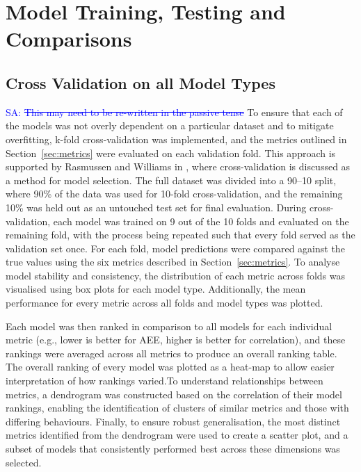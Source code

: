 \documentclass{ucdgradtaughtthesis}
\newcommand{\Sarp}[1]{{\textcolor{blue}{{SA: #1}} }}
\begin{document}
\section{Model Training, Testing and Comparisons}
%
%
\subsection{Cross Validation on all Model Types}
\Sarp{\sout{This may need to be re-written in the passive tense}}
To ensure that each of the models was not overly dependent on a particular dataset and to mitigate overfitting, 
k-fold cross-validation was implemented, and the metrics outlined in Section~\ref{sec:metrics} were evaluated on each validation fold. 
This approach is supported by Rasmussen and Williams in \cite[Ch.5]{bible}, where cross-validation is discussed as a method for model selection.
The full dataset was divided into a 90--10 split, where 90\% of the data was used for 10-fold cross-validation, and the remaining 10\% was held out 
as an untouched test set for final evaluation. During cross-validation, each model was trained on 9 out of the 10 folds and evaluated on the remaining fold, 
with the process being repeated such that every fold served as the validation set once. For each fold, model predictions were compared against the true values using the six metrics
described in Section~\ref{sec:metrics}.
To analyse model stability and consistency, the distribution of each metric across folds was visualised using box plots for each model type. Additionally, the mean performance for every metric 
across all folds and model types was plotted.

Each model was then ranked in comparison to all models for each individual metric (e.g., lower is better for AEE, higher is better for correlation), 
and these rankings were averaged across all metrics to produce an overall ranking table. The overall ranking of every model was plotted as a heat-map to allow easier interpretation
of how rankings varied.To understand relationships between metrics, a dendrogram was constructed based on the correlation of their model rankings, 
enabling the identification of clusters of similar metrics and those with differing behaviours. 
Finally, to ensure robust generalisation, the most distinct metrics identified from the dendrogram were used to 
create a scatter plot, and a subset of models that consistently performed best across these dimensions was selected.
\end{document}
